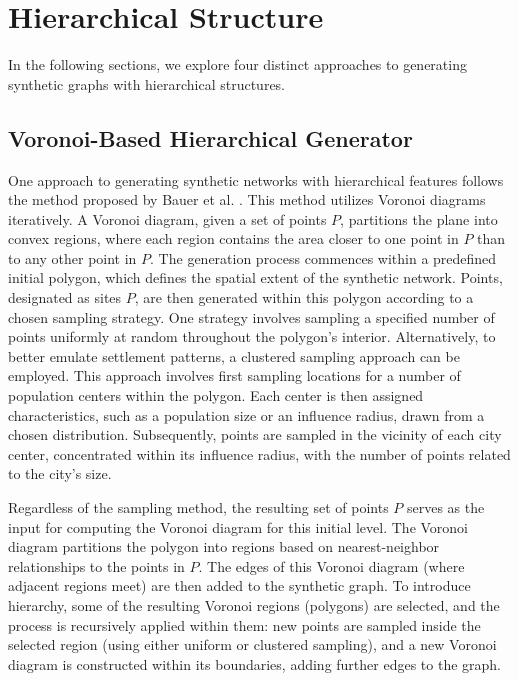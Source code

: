 \section{Hierarchical Structure}

In the following sections, we explore four distinct approaches to generating synthetic graphs with hierarchical structures.

\subsection{Voronoi-Based Hierarchical Generator}

One approach to generating synthetic networks with hierarchical features follows the method proposed by Bauer et al. \cite{hutchison_synthetic_2010}.
This method utilizes Voronoi diagrams iteratively.
A Voronoi diagram, given a set of points \(P\), partitions the plane into convex regions, where each region contains the area closer to one point in \(P\) than to any other point in \(P\).
The generation process commences within a predefined initial polygon, which defines the spatial extent of the synthetic network.
Points, designated as sites \(P\), are then generated within this polygon according to a chosen sampling strategy.
One strategy involves sampling a specified number of points uniformly at random throughout the polygon's interior.
Alternatively, to better emulate settlement patterns, a clustered sampling approach can be employed.
This approach involves first sampling locations for a number of population centers within the polygon.
Each center is then assigned characteristics, such as a population size or an influence radius, drawn from a chosen distribution.
Subsequently, points are sampled in the vicinity of each city center, concentrated within its influence radius, with the number of points related to the city's size.

Regardless of the sampling method, the resulting set of points \(P\) serves as the input for computing the Voronoi diagram for this initial level.
The Voronoi diagram partitions the polygon into regions based on nearest-neighbor relationships to the points in \(P\).
The edges of this Voronoi diagram (where adjacent regions meet) are then added to the synthetic graph.
To introduce hierarchy, some of the resulting Voronoi regions (polygons) are selected, and the process is recursively applied within them: new points are sampled inside the selected region (using either uniform or clustered sampling), and a new Voronoi diagram is constructed within its boundaries, adding further edges to the graph.

